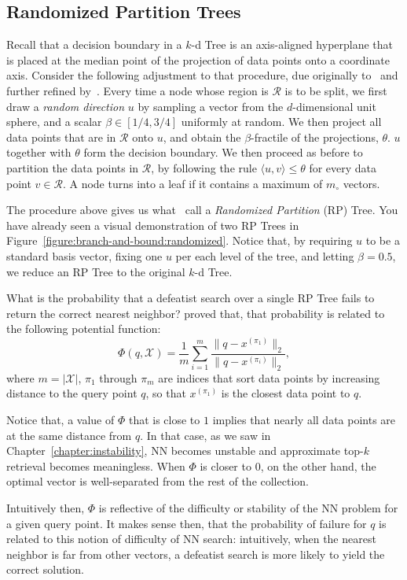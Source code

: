 \subsection{Randomized Partition Trees}

Recall that a decision boundary in a $k$-d Tree is an axis-aligned hyperplane that is placed at the median point
of the projection of data points onto a coordinate axis.
Consider the following adjustment to that procedure, due originally to~\cite{liu2004SpillTree}
and further refined by~\cite{dasgupta2015rptrees}.
Every time a node whose region is $\mathcal{R}$ is to be split, we first draw a \emph{random direction}
$u$ by sampling a vector from the $d$-dimensional unit sphere, and a scalar $\beta \in [1/4, 3/4]$ uniformly at random.
We then project all data points that are in $\mathcal{R}$ onto $u$,
and obtain the $\beta$-fractile of the projections, $\theta$. $u$ together with $\theta$ form the decision
boundary. We then proceed as before to partition the data points in $\mathcal{R}$, by following the rule
$\langle u, v \rangle \leq \theta$ for every data point $v \in \mathcal{R}$.
A node turns into a leaf if it contains a maximum of $m_\circ$ vectors.

The procedure above gives us what~\cite{dasgupta2015rptrees} call a \emph{Randomized Partition} (RP) Tree.
You have already seen a visual demonstration of two RP Trees in Figure~\ref{figure:branch-and-bound:randomized}.
Notice that, by requiring $u$ to be a standard basis vector, fixing one $u$ per each level of the tree,
and letting $\beta=0.5$, we reduce an RP Tree to the original $k$-d Tree.

What is the probability that a defeatist search over a single RP Tree fails to return the correct nearest neighbor?
\cite{dasgupta2015rptrees} proved that, that probability is related to the following potential function:
\begin{equation}
    \label{equation:branch-and-bound:randomized:potential}
    \Phi(q, \mathcal{X}) = \frac{1}{m} \sum_{i=1}^{m}
    \frac{\lVert q - x^{(\pi_1)} \rVert_2}{\lVert q - x^{(\pi_i)} \rVert_2},
\end{equation}
where $m = \lvert \mathcal{X} \rvert$, $\pi_1$ through $\pi_m$ are indices that
sort data points by increasing distance to the query point $q$, so that $x^{(\pi_1)}$
is the closest data point to $q$.

\begin{svgraybox}
Notice that, a value of $\Phi$ that is close to $1$ implies that nearly
all data points are at the same distance from $q$. In that case, as we saw in Chapter~\ref{chapter:instability},
NN becomes unstable and approximate top-$k$ retrieval becomes meaningless.
When $\Phi$ is closer to $0$, on the other hand, the optimal vector is well-separated
from the rest of the collection.

Intuitively then, $\Phi$ is reflective of the difficulty or stability of the NN problem for a given query point.
It makes sense then, that the probability of failure for $q$ is related to this notion of difficulty
of NN search: intuitively, when the nearest neighbor is far from other vectors, a defeatist search is more likely
to yield the correct solution.
\end{svgraybox}

